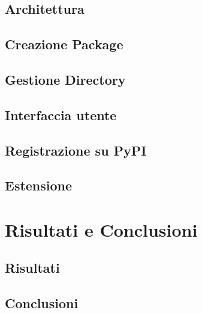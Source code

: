 \documentclass[a4paper,12pt, doubleside]{report}
\begin{document}
            
        \section{Architettura}
            
        \section{Creazione Package}
        \section{Gestione Directory}
        \section{Interfaccia utente}
        \section{Registrazione su PyPI}
        \section{Estensione}
            
    \chapter{Risultati e Conclusioni}
        \section{Risultati}
        \section{Conclusioni}
\end{document}
